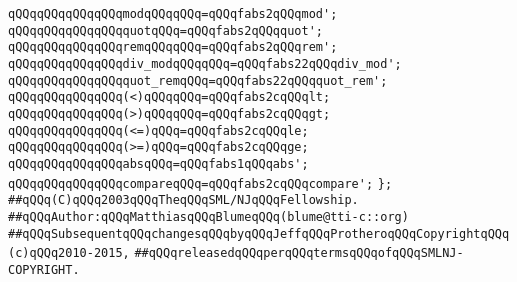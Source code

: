 \verb|qQQqqQQqqQQqqQQqmodqQQqqQQq=qQQqfabs2qQQqmod';|\newline
\verb|qQQqqQQqqQQqqQQqquotqQQq=qQQqfabs2qQQqquot';|\newline
\verb|qQQqqQQqqQQqqQQqremqQQqqQQq=qQQqfabs2qQQqrem';|\newline
\newline
\verb|qQQqqQQqqQQqqQQqdiv_modqQQqqQQq=qQQqfabs22qQQqdiv_mod';|\newline
\verb|qQQqqQQqqQQqqQQqquot_remqQQq=qQQqfabs22qQQqquot_rem';|\newline
\newline
\verb|qQQqqQQqqQQqqQQq(<)qQQqqQQq=qQQqfabs2cqQQqlt;|\newline
\verb|qQQqqQQqqQQqqQQq(>)qQQqqQQq=qQQqfabs2cqQQqgt;|\newline
\verb|qQQqqQQqqQQqqQQq(<=)qQQq=qQQqfabs2cqQQqle;|\newline
\verb|qQQqqQQqqQQqqQQq(>=)qQQq=qQQqfabs2cqQQqge;|\newline
\newline
\verb|qQQqqQQqqQQqqQQqabsqQQq=qQQqfabs1qQQqabs';|\newline
\newline
\verb|qQQqqQQqqQQqqQQqcompareqQQq=qQQqfabs2cqQQqcompare';|\newline
\verb|};|\newline
\newline
\newline
\verb|##qQQq(C)qQQq2003qQQqTheqQQqSML/NJqQQqFellowship.|\newline
\verb|##qQQqAuthor:qQQqMatthiasqQQqBlumeqQQq(blume@tti-c::org)|\newline
\verb|##qQQqSubsequentqQQqchangesqQQqbyqQQqJeffqQQqProtheroqQQqCopyrightqQQq(c)qQQq2010-2015,|\newline
\verb|##qQQqreleasedqQQqperqQQqtermsqQQqofqQQqSMLNJ-COPYRIGHT.|\newline
\newline
\newline

